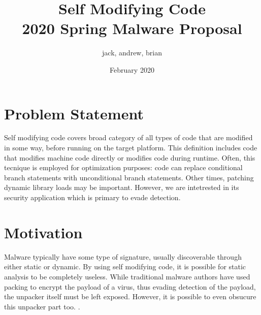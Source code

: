 \documentclass{article}
\title{Self Modifying Code \\ \small 2020 Spring Malware Proposal}
\author{jack, andrew, brian}
\date{February 2020}
\begin{document}
\maketitle

\section{Problem Statement}
Self modifying code covers broad category of all types of code that are modified in some way, before running 
on the target platform. This definition includes code that modifies machine code directly or modifies code during 
runtime. Often, this tecnique is employed for optimization purposes: code can 
replace conditional branch statements with unconditional branch statements.
Other times, patching dynamic library loads may be important. However, we are 
intetrested in its security application which is primary to evade detection.



\section{Motivation}
Malware typically have some type of signature, usually discoverable through either static 
or dynamic. By using self modifying code, it is possible for static analysis to be completely
useless. While traditional malware authors have used packing to encrypt the payload of a virus,
thus evading detection of the payload, the unpacker itself must be left exposed. 
However, it is possible to even obsucure this unpacker part too. \cite{cai2007certified}.





\end{document}
